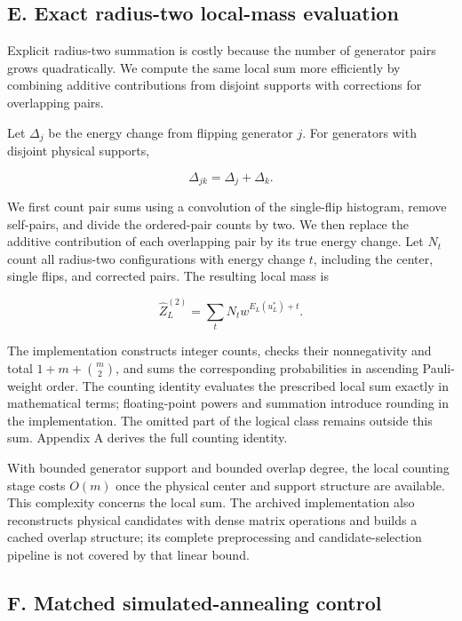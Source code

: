\documentclass[
  10pt,
]{article}
\begin{document}
\subsection{E. Exact radius-two local-mass
evaluation}\label{e.-exact-radius-two-local-mass-evaluation}

Explicit radius-two summation is costly because the number of generator
pairs grows quadratically. We compute the same local sum more
efficiently by combining additive contributions from disjoint supports
with corrections for overlapping pairs.

Let \(\Delta_j\) be the energy change from flipping generator \(j\). For
generators with disjoint physical supports,

\[
\Delta_{jk}=\Delta_j+\Delta_k.
\tag{8}\label{eq:8}
\]

We first count pair sums using a convolution of the single-flip
histogram, remove self-pairs, and divide the ordered-pair counts by two.
We then replace the additive contribution of each overlapping pair by
its true energy change. Let \(N_t\) count all radius-two configurations
with energy change \(t\), including the center, single flips, and
corrected pairs. The resulting local mass is

\[
\widehat Z_L^{(2)}=\sum_t N_t w^{E_L(u_L^*)+t}.
\]

The implementation constructs integer counts, checks their nonnegativity
and total \(1+m+\binom m2\), and sums the corresponding probabilities in
ascending Pauli-weight order. The counting identity evaluates the
prescribed local sum exactly in mathematical terms; floating-point
powers and summation introduce rounding in the implementation. The
omitted part of the logical class remains outside this sum. Appendix A
derives the full counting identity.

With bounded generator support and bounded overlap degree, the local
counting stage costs \(O(m)\) once the physical center and support
structure are available. This complexity concerns the local sum. The
archived implementation also reconstructs physical candidates with dense
matrix operations and builds a cached overlap structure; its complete
preprocessing and candidate-selection pipeline is not covered by that
linear bound.

\subsection{F. Matched simulated-annealing
control}\label{f.-matched-simulated-annealing-control}
\end{document}

